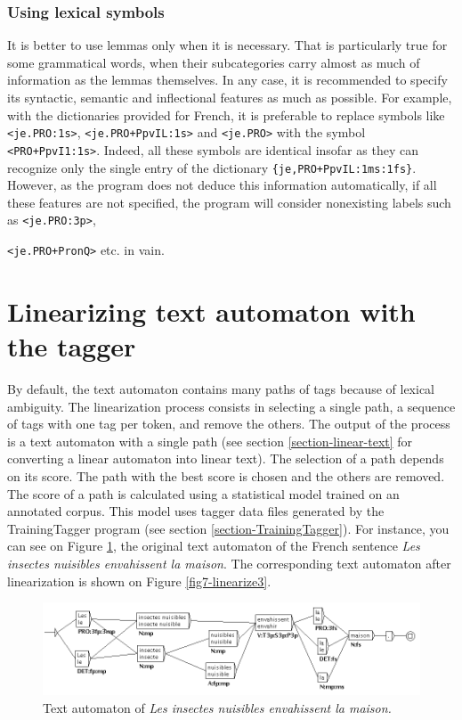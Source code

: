 \subsubsection{Using lexical symbols}

It is better to use lemmas only when it is necessary. That is particularly true
for some grammatical words, when their subcategories carry almost as much of
information as the lemmas themselves. In any case, it is recommended to specify
its syntactic, semantic and inflectional features as much as possible. For
example, with the dictionaries provided for French, it is preferable to replace
symbols like \verb$<je.PRO:1s>$, \verb$<je.PRO+PpvIL:1s>$ and \verb$<je.PRO>$
with the symbol \verb$<PRO+PpvI1:1s>$. Indeed, all these symbols are identical
insofar as they can recognize only the single entry of the dictionary
\verb${je,PRO+PpvIL:1ms:1fs}$. However, as the program does not deduce this
information automatically, if all these features are not specified, the program
will consider nonexisting labels such as \verb$<je.PRO:3p>$, 

\noindent \verb$<je.PRO+PronQ>$ etc. in vain.


\section{Linearizing text automaton with the tagger}
\label{section-linearization}
By default, the text automaton contains many paths of tags because of lexical ambiguity.
The linearization process consists in 
selecting a single path, a sequence of tags with one tag per token, and remove the others. 
The output of the process is a text automaton with a single path (see section \ref{section-linear-text}
for converting a linear automaton into linear text). The selection of a path depends on its score.
The path with the best score is chosen 
and the others are removed. The score of a path is calculated using a statistical model trained
on an annotated corpus. This model uses tagger data files generated by the TrainingTagger program 
(see section \ref{section-TrainingTagger}). 
For instance, you can see on Figure \ref{fig7-linearize2}, the original text automaton of the French sentence 
\textit{Les insectes nuisibles envahissent la maison}. The corresponding text automaton after linearization is 
shown on Figure \ref{fig7-linearize3}.

\begin{figure}[!ht]
\begin{center}
\includegraphics[width=16cm]{resources/img/fig7-linearize2.png}
\caption{Text automaton of \textit{Les insectes nuisibles envahissent la maison.}\label{fig7-linearize2}}
\end{center}
\end{figure}

